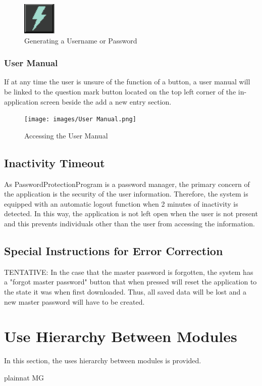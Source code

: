 \documentclass[12pt, titlepage]{article}
\begin{document}
\begin{figure}[h]
	\includegraphics[scale=0.3]{images/Generate.png}
	\caption{Generating a Username or Password}
	\label{fig:genPass}
\end{figure}

\subsubsection{User Manual} \label{UseMan}

If at any time the user is unsure of the function of a button, a user manual will be linked to the question mark button located on the top left corner of the in-application screen beside the add a new entry section.

\begin{figure}[h]
	\texttt{[image: images/User Manual.png]}
	\caption{Accessing the User Manual}
	\label{fig:UsMan}
\end{figure}

\subsection{Inactivity Timeout} \label{InacTime}

As PasswordProtectionProgram is a password manager, the primary concern of the application is the security of the user information. Therefore, the system is equipped with an automatic logout function when 2 minutes of inactivity is detected. In this way, the application is not left open when the user is not present and this prevents individuals other than the user from accessing the information.

\subsection{Special Instructions for Error Correction} \label{ErrCorr}

TENTATIVE: In the case that the master password is forgotten, the system has a "forgot master password" button that when pressed will reset the application to the state it was when first downloaded. Thus, all saved data will be lost and a new master password will have to be created.


\section{Use Hierarchy Between Modules} \label{SecUse}

In this section, the uses hierarchy between modules is
provided. \citet{Parnas1978} 



 {plainnat}
 {MG}
\end{document}
